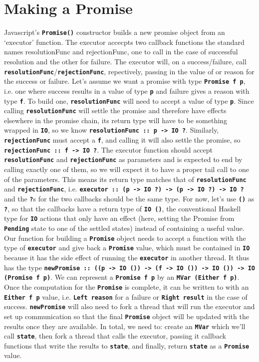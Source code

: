 \documentclass[12pt, english, letterpaper]{kuthesis}
\newcommand{\lit}[1]{\textbf{\texttt{#1}}}
\begin{document}
\section*{Making a Promise}
Javascript's \lit{Promise()} constructor builds a new promise object from an `executor' function.  The executor accecpts two callback functions the standard names resolutionFunc and rejectionFunc, one to call in the case of successful resolution and the other for failure.  The executor will, on a success/failure, call \lit{resolutionFunc}/\lit{rejectionFunc}, repectively, passing in the value of or reason for the success or failure.  Let's assume we want a promise with type \lit{Promise f p}, i.e. one where success results in a value of type \lit p and failure gives a reason with type \lit f.  To build one, \lit{resolutionFunc} will need to accept a value of type \lit p.  Since calling \lit{resolutionFunc} will settle the promise and therefore have effects elsewhere in the promise chain, its return type will have to be something wrapped in \lit{IO}, so we know \lit{resolutionFunc ::\ p -> IO ?}.  Similarly, \lit{rejectionFunc} must accept a \lit f, and calling it will also settle the promise, so \lit{rejectionFunc ::\ f -> IO ?}.  The executor function should accept \lit{resolutionFunc} and \lit{rejectionFunc} as parameters and is expected to end by calling exactly one of them, so we will expect it to have a proper tail call to one of the parameters.  This means its return type matches that of \lit{resolutionFunc} and \lit{rejectionFunc}, i.e. \lit{executor ::\ (p -> IO ?) -> (p -> IO ?) -> IO ?} and the \lit ?s for the two callbacks should be the same type.  For now, let's use \lit{()} as \lit ?, so that the callbacks have a return type of \lit{IO ()}, the conventional Haskell type for \lit{IO} actions that only have an effect (here, setting the Promise from \lit{Pending} state to one of the settled states) instead of containing a useful value.  Our function for building a \lit{Promise} object needs to accept a function with the type of \lit{executor} and give back a \lit{Promise} value, which must be contained in \lit{IO} because it has the side effect of running the \lit{executor} in another thread.  It thus has the type \lit{newPromise ::\ ((p -> IO ()) -> (f -> IO ()) -> IO ()) -> IO (Promise f p)}.  We can represent a \lit{Promise f p} by an \lit{MVar (Either f p)}.  Once the computation for the \lit{Promise} is complete, it can be written to with an \lit{Either f p} value, i.e. \lit{Left reason} for a failure or \lit{Right result} in the case of success.  \lit{newPromise} will also need to fork a thread that will run the executor and set up communication so that the final \lit{Promise} object will be updated with the results once they are available.  In total, we need to: create an \lit{MVar} which we'll call \lit{state}, then fork a thread that calls the executor, passing it callback functions that write the results to \lit{state}, and finally, return \lit{state} as a \lit{Promise} value.
\end{document}
